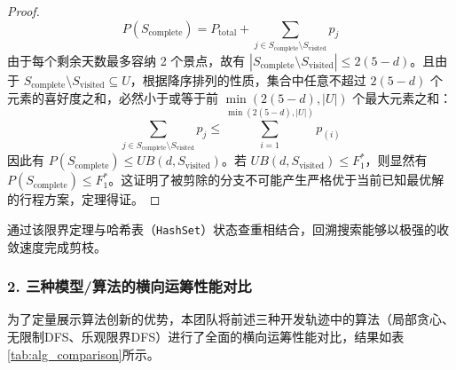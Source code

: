 \documentclass{cumcmthesis}
\begin{document}
\begin{enumerate}
\begin{proof}
\begin{equation}
P(S_{\text{complete}}) = P_{\text{total}} + \sum_{j \in S_{\text{complete}} \setminus S_{\text{visited}}} p_j
\end{equation}
由于每个剩余天数最多容纳 2 个景点，故有 $|S_{\text{complete}} \setminus S_{\text{visited}}| \le 2(5-d)$。且由于 $S_{\text{complete}} \setminus S_{\text{visited}} \subseteq U$，根据降序排列的性质，集合中任意不超过 $2(5-d)$ 个元素的喜好度之和，必然小于或等于前 $\min\left(2(5-d), |U|\right)$ 个最大元素之和：
\begin{equation}
\sum_{j \in S_{\text{complete}} \setminus S_{\text{visited}}} p_j \le \sum_{i=1}^{\min\left(2(5-d), |U|\right)} p_{(i)}
\end{equation}
因此有 $P(S_{\text{complete}}) \le UB(d, S_{\text{visited}})$。若 $UB(d, S_{\text{visited}}) \le F_1^*$，则显然有 $P(S_{\text{complete}}) \le F_1^*$。这证明了被剪除的分支不可能产生严格优于当前已知最优解的行程方案，定理得证。
\end{proof}
通过该限界定理与哈希表（\texttt{HashSet}）状态查重相结合，回溯搜索能够以极强的收敛速度完成剪枝。
\end{enumerate}

\subsubsection{2. 三种模型/算法的横向运筹性能对比}
为了定量展示算法创新的优势，本团队将前述三种开发轨迹中的算法（局部贪心、无限制DFS、乐观限界DFS）进行了全面的横向运筹性能对比，结果如表\ref{tab:alg_comparison}所示。

\begin{table}[htbp]
\centering
\caption{三种寻优算法/模型在自驾出游多时窗规划下的性能指标对比表}
\label{tab:alg_comparison}
\small
{}
\end{table}
\end{document}
